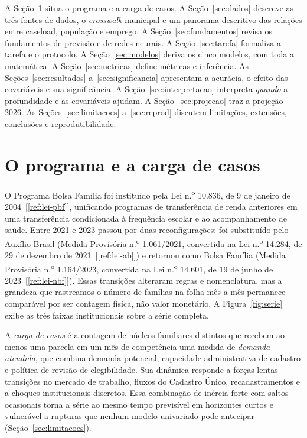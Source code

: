 \documentclass[12pt,a4paper,oneside]{article}
\newcommand{\C}[1]{[\ref{#1}]}
\begin{document}
A Seção~\ref{sec:contexto} situa o programa e a carga de casos. A
Seção~\ref{sec:dados} descreve as três fontes de dados, o \emph{crosswalk}
municipal e um panorama descritivo das relações entre caseload, população
e emprego. A Seção~\ref{sec:fundamentos} revisa os fundamentos de previsão
e de redes neurais. A Seção~\ref{sec:tarefa} formaliza a tarefa e o
protocolo. A Seção~\ref{sec:modelos} deriva os cinco modelos, com toda a
matemática. A Seção~\ref{sec:metricas} define métricas e inferência. As
Seções~\ref{sec:resultados} a~\ref{sec:significancia} apresentam a
acurácia, o efeito das covariáveis e sua significância. A
Seção~\ref{sec:interpretacao} interpreta \emph{quando} a profundidade e as
covariáveis ajudam. A Seção~\ref{sec:projecao} traz a projeção
2026. As Seções~\ref{sec:limitacoes}
a~\ref{sec:reprod} discutem limitações, extensões, conclusões e
reprodutibilidade.

\section{O programa e a carga de casos}
\label{sec:contexto}

O Programa Bolsa Família foi instituído pela Lei n.\textsuperscript{o}
10.836, de 9 de janeiro de 2004~\C{ref:lei-pbf}, unificando programas de
transferência de renda anteriores em uma transferência condicionada à
frequência escolar e ao acompanhamento de saúde. Entre 2021 e 2023 passou
por duas reconfigurações: foi substituído pelo Auxílio Brasil (Medida
Provisória n.\textsuperscript{o} 1.061/2021, convertida na Lei
n.\textsuperscript{o} 14.284, de 29 de dezembro de 2021~\C{ref:lei-ab}) e
retornou como Bolsa Família (Medida Provisória n.\textsuperscript{o}
1.164/2023, convertida na Lei n.\textsuperscript{o} 14.601, de 19 de junho
de 2023~\C{ref:lei-nbf}). Essas transições alteraram regras e
nomenclatura, mas a grandeza que rastreamos \textemdash{} o número de
famílias na folha mês a mês \textemdash{} permanece comparável por ser
contagem física, não valor monetário. A Figura~\ref{fig:serie} exibe as
três faixas institucionais sobre a série completa.

A \emph{carga de casos} é a contagem de núcleos familiares distintos que
recebem ao menos uma parcela em um mês de competência \textemdash{} uma
medida de \emph{demanda atendida}, que combina demanda potencial,
capacidade administrativa de cadastro e política de revisão de
elegibilidade. Sua dinâmica responde a forças lentas \textemdash{}
transições no mercado de trabalho, fluxos do Cadastro Único,
recadastramentos \textemdash{} e a choques institucionais discretos. Essa
combinação de inércia forte com saltos ocasionais torna a série ao mesmo
tempo previsível em horizontes curtos e vulnerável a rupturas que nenhum
modelo univariado pode antecipar (Seção~\ref{sec:limitacoes}).
\end{document}
